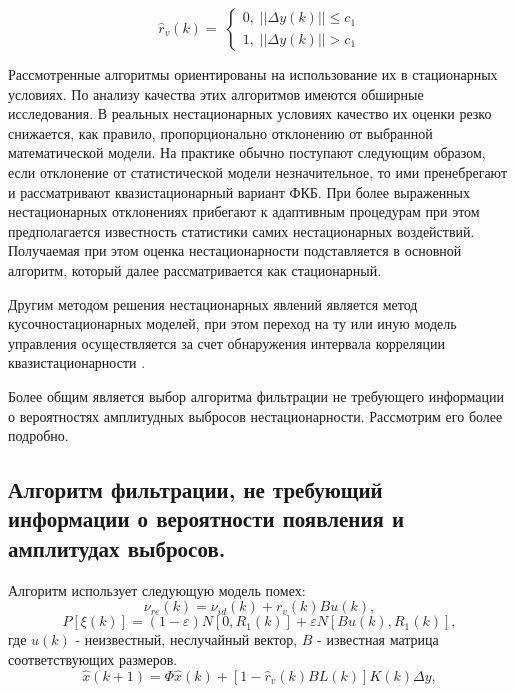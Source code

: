 \begin{equation}
\hat{r}_v(k)= \;
\begin{cases}
0, \; ||\Delta y(k)||\leq c_1 \\    
1, \; ||\Delta y(k)||> c_1    
\end{cases}
\end{equation}

Рассмотренные алгоритмы ориентированы на использование их в стационарных условиях. По анализу качества этих алгоритмов имеются обширные исследования\cite{Klekis,huber,tihonov}. 
В реальных нестационарных условиях качество их оценки резко снижается, как правило, пропорционально отклонению от выбранной математической модели.
На практике обычно поступают следующим образом, если отклонение от статистической модели незначительное, то ими пренебрегают и рассматривают квазистационарный вариант ФКБ. 
При более выраженных нестационарных отклонениях прибегают к адаптивным процедурам \cite{tihonov,popovski}
при этом предполагается известность статистики самих нестационарных воздействий.
Получаемая при этом оценка нестационарности подставляется в основной алгоритм, который далее рассматривается как стационарный.

Другим методом решения нестационарных явлений является метод кусочностационарных моделей, при этом переход на ту или иную модель управления осуществляется за счет обнаружения интервала корреляции квазистационарности \cite{tihonov}.

Более общим является выбор алгоритма фильтрации не требующего информации о вероятностях амплитудных выбросов нестационарности.
Рассмотрим его более подробно.

\subsection{Алгоритм фильтрации, не требующий информации о вероятности появления и амплитудах выбросов.} Алгоритм использует следующую модель помех:
\begin{equation}\label{eq3:optim5_01}
\nu_{re}(k)=\nu_{id}(k)+r_v(k)Bu(k),
\end{equation}
\begin{equation}\label{eq3:optim5_02}
P[\xi(k)]=(1-\varepsilon)N[0,R_1(k)]+\varepsilon N[Bu(k),R_1(k)],
\end{equation}
\noindent где $u(k)$ - неизвестный, неслучайный вектор, $B$ - известная матрица соответствующих размеров.
\begin{equation}\label{eq3:optim5}
\hat{x}(k+1)=\Phi\hat{x}(k)+[1-\hat{r}_v(k)BL(k)]K(k)\Delta y,
\end{equation}

